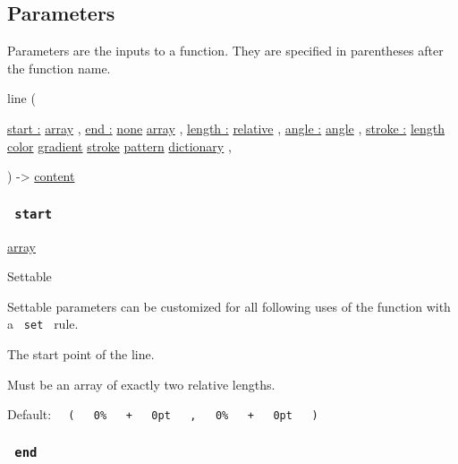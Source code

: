\subsection{\texorpdfstring{{ Parameters
}}{ Parameters }}\label{parameters}

\label{parameters-tooltip}
Parameters are the inputs to a function. They are specified in
parentheses after the function name.

{ line } (

{ \hyperref[parameters-start]{start :}
\href{/docs/reference/foundations/array/}{array} , } {
\hyperref[parameters-end]{end :}
\href{/docs/reference/foundations/none/}{none}
\href{/docs/reference/foundations/array/}{array} , } {
\hyperref[parameters-length]{length :}
\href{/docs/reference/layout/relative/}{relative} , } {
\hyperref[parameters-angle]{angle :}
\href{/docs/reference/layout/angle/}{angle} , } {
\hyperref[parameters-stroke]{stroke :}
\href{/docs/reference/layout/length/}{length}
\href{/docs/reference/visualize/color/}{color}
\href{/docs/reference/visualize/gradient/}{gradient}
\href{/docs/reference/visualize/stroke/}{stroke}
\href{/docs/reference/visualize/pattern/}{pattern}
\href{/docs/reference/foundations/dictionary/}{dictionary} , }

) -\textgreater{} \href{/docs/reference/foundations/content/}{content}

\subsubsection{\texorpdfstring{\texttt{\ start\ }}{ start }}\label{parameters-start}

\href{/docs/reference/foundations/array/}{array}

{{ Settable }}

\label{parameters-start-settable-tooltip}
Settable parameters can be customized for all following uses of the
function with a \texttt{\ set\ } rule.

The start point of the line.

Must be an array of exactly two relative lengths.

Default:
\texttt{\ }{\texttt{\ (\ }}\texttt{\ }{\texttt{\ 0\%\ }}\texttt{\ }{\texttt{\ +\ }}\texttt{\ }{\texttt{\ 0pt\ }}\texttt{\ }{\texttt{\ ,\ }}\texttt{\ }{\texttt{\ 0\%\ }}\texttt{\ }{\texttt{\ +\ }}\texttt{\ }{\texttt{\ 0pt\ }}\texttt{\ }{\texttt{\ )\ }}\texttt{\ }

\subsubsection{\texorpdfstring{\texttt{\ end\ }}{ end }}\label{parameters-end}

